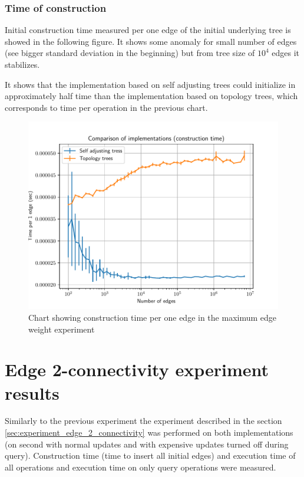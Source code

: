 \vfill\eject %

\subsubsection{Time of construction}

Initial construction time measured per one edge of the initial underlying tree
is showed in the following figure. It shows some anomaly for small number of
edges (see bigger standard deviation in the beginning) but from tree size of
$10^4$ edges it stabilizes.

It shows that the implementation based on self adjusting trees could initialize
in approximately half time than the implementation based on topology trees,
which corresponds to time per operation in the previous chart.

\begin{figure}[H]
\centering
{}\hsize
\includegraphics[width=\hsize]{charts/maximum_edge_weight_construction.pdf}
\caption{Chart showing construction time per one edge in the maximum edge weight
experiment}
\end{figure}

\vfill\eject %

\section{Edge 2-connectivity experiment results}
\label{sec:results_edge_2_connectivity}

Similarly to the previous experiment the experiment described in the section
\ref{sec:experiment_edge_2_connectivity} was performed on both implementations
(on second with normal updates and with expensive updates turned off during
query). Construction time (time to insert all initial edges) and execution time
of all operations and execution time on only query operations were measured.

